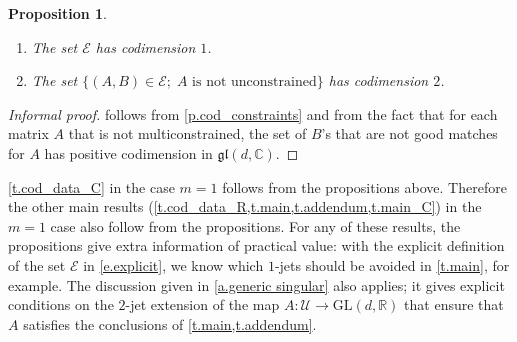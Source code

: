 \documentclass[10pt, a4paper]{amsart}
\theoremstyle{plain}
\newtheorem{prop}[lemma]{Proposition}
\theoremstyle{definition}
\theoremstyle{remark}
\theoremstyle{note}
\numberwithin{equation}{section}
\begin{document}
\begin{prop}\label{p.cod_RH}
\begin{enumerate}
\item The set ${\mathcal{E}}$ has codimension $1$.
\item The set $\{(A,B) \in {\mathcal{E}}; \; A \text{ is not unconstrained}\}$ has codimension $2$.
\end{enumerate}
\end{prop}

\begin{proof}[Informal proof]
 follows from \cref{p.cod_constraints}
and from the fact that for each matrix $A$ that is not multiconstrained,
the set of $B$'s that are not good matches for $A$
has positive codimension in ${\mathfrak{gl}}(d,{\mathbb{C}})$.
\end{proof}

\cref{t.cod_data_C} in the case $m=1$ follows from the propositions above.
Therefore the other main results (\cref{t.cod_data_R,t.main,t.addendum,t.main_C}) in the $m=1$ 
case also follow from  the propositions.
For any of these results, the propositions give extra information of practical value: 
with the explicit definition of the set ${\mathcal{E}}$ in \eqref{e.explicit}, we know 
which $1$-jets should be avoided in \cref{t.main}, for example.
The discussion given in \cref{a.generic singular}
also applies; it gives explicit conditions on the $2$-jet extension of the map 
$A \colon {\mathcal{U}} \to {\mathrm{GL}}(d,{\mathbb{R}})$ that ensure that $A$ satisfies the conclusions of \cref{t.main,t.addendum}.
 
\end{document}
